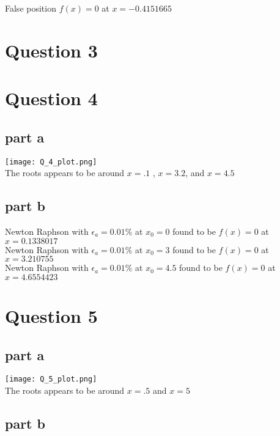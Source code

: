\documentclass[11pt]{article} %
\begin{document}
False position $f(x) = 0$ at $x = -0.4151665$

\section{Question 3}



\section{Question 4}

\subsection{part a}

\texttt{[image: Q\_4\_plot.png]} \\
The roots appears to be around $x = .1$ , $x = 3.2$, and $x=4.5$

\subsection{part b}

Newton Raphson with $\epsilon_a = 0.01\%$ at $x_0 = 0$ found to be $ f(x) = 0$ at $x = 0.1338017$ \\
Newton Raphson with $\epsilon_a = 0.01\%$ at $x_0 = 3$ found to be $ f(x) = 0$ at $x = 3.210755$ \\
Newton Raphson with $\epsilon_a = 0.01\%$ at $x_0 = 4.5$ found to be $ f(x) = 0$ at $x = 4.6554423$

\section{Question 5}

\subsection{part a}

\texttt{[image: Q\_5\_plot.png]} \\
The roots appears to be around $x=.5$ and $x=5$

\subsection{part b}
\end{document}
